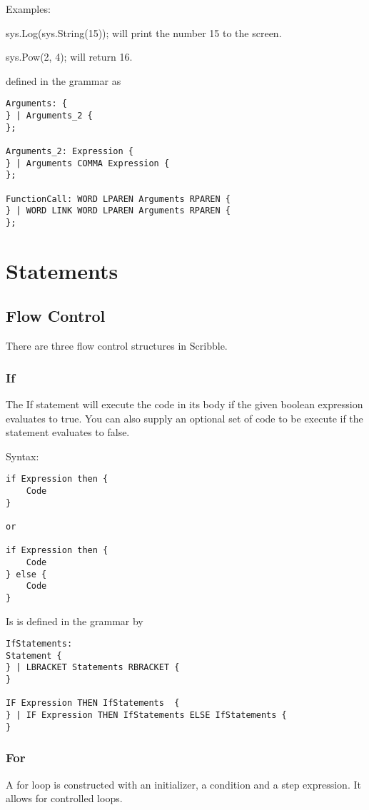 \documentclass[]{final_report}
\begin{document}
Examples:

sys.Log(sys.String(15)); will print the number 15 to the screen.

sys.Pow(2, 4); will return 16.

defined in the grammar as
\begin{verbatim}
Arguments: {
} | Arguments_2 {
};

Arguments_2: Expression {
} | Arguments COMMA Expression {
};

FunctionCall: WORD LPAREN Arguments RPAREN {
} | WORD LINK WORD LPAREN Arguments RPAREN {
};
\end{verbatim}

\chapter{Statements}

\section{Flow Control}

There are three flow control structures in Scribble.

\subsection{If}

The If statement will execute the code in its body if the given boolean expression evaluates to true. You can also supply an optional set of code to be execute if the statement evaluates to false.

Syntax: 
\begin{verbatim}
if Expression then {
	Code
}

or

if Expression then {
	Code
} else {
	Code
}
\end{verbatim}

Is is defined in the grammar by
\begin{verbatim}
IfStatements: 
Statement {
} | LBRACKET Statements RBRACKET {
}

IF Expression THEN IfStatements  {
} | IF Expression THEN IfStatements ELSE IfStatements {
}
\end{verbatim}

\subsection{For}

A for loop is constructed with an initializer, a condition and a step expression. It allows for controlled loops.
\end{document}
